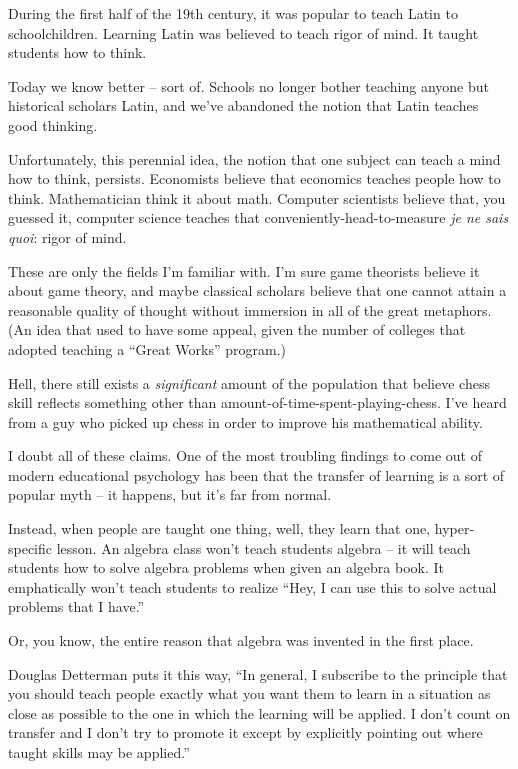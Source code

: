 During the first half of the 19th century, it was popular to teach Latin to
schoolchildren. Learning Latin was believed to teach rigor of mind. It taught
students how to think.

Today we know better -- sort of. Schools no longer bother teaching anyone but
historical scholars Latin, and we've abandoned the notion that Latin teaches
good thinking.

Unfortunately, this perennial idea, the notion that one subject can teach a mind
how to think, persists. Economists believe that economics teaches people how to
think. Mathematician think it about math. Computer scientists believe that, you
guessed it, computer science teaches that conveniently-head-to-measure
\textit{je ne sais quoi}: rigor of mind.

These are only the fields I'm familiar with. I'm sure game theorists believe it
about game theory, and maybe classical scholars believe that one cannot attain a
reasonable quality of thought without immersion in all of the great
metaphors. (An idea that used to have some appeal, given the number of colleges
that adopted teaching a ``Great Works'' program.)

Hell, there still exists a \textit{significant} amount of the population that
believe chess skill reflects something other than
amount-of-time-spent-playing-chess. I've heard from a guy who picked up chess in
order to improve his mathematical ability.

I doubt all of these claims. One of the most troubling findings to come out of
modern educational psychology has been that the transfer of learning is a sort
of popular myth -- it happens, but it's far from normal.

Instead, when people are taught one thing, well, they learn that one,
hyper-specific lesson. An algebra class won't teach students algebra -- it will
teach students how to solve algebra problems when given an algebra book. It
emphatically won't teach students to realize ``Hey, I can use this to solve
actual problems that I have.''

Or, you know, the entire reason that algebra was invented in the first place.

Douglas Detterman puts it this way, ``In general, I subscribe to the principle
that you should teach people exactly what you want them to learn in a situation
as close as possible to the one in which the learning will be applied.  I don't
count on transfer and I don't try to promote it except by explicitly pointing
out where taught skills may be applied.''


